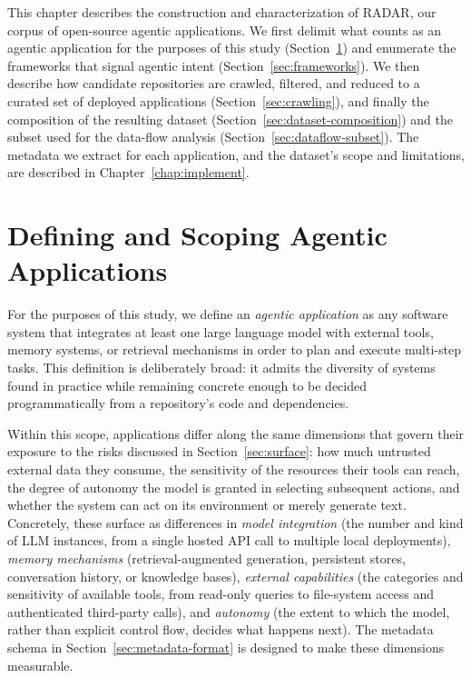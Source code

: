 \providecommand{\pv}[1]{\textcolor{blue}{#1}} %
\label{chap:toolkit}

This chapter describes the construction and characterization of RADAR, our corpus of open-source agentic applications. We first delimit what counts as an agentic application for the purposes of this study (Section~\ref{sec:defining-agentic}) and enumerate the frameworks that signal agentic intent (Section~\ref{sec:frameworks}). We then describe how candidate repositories are crawled, filtered, and reduced to a curated set of deployed applications (Section~\ref{sec:crawling}), and finally the composition of the resulting dataset (Section~\ref{sec:dataset-composition}) and the subset used for the data-flow analysis (Section~\ref{sec:dataflow-subset}). The metadata we extract for each application, and the dataset's scope and limitations, are described in Chapter~\ref{chap:implement}.
 

\section{Defining and Scoping Agentic Applications}
\label{sec:defining-agentic}
 
For the purposes of this study, we define an \emph{agentic application} as any software system that integrates at least one large language model with external tools, memory systems, or retrieval mechanisms in order to plan and execute multi-step tasks. This definition is deliberately broad: it admits the diversity of systems found in practice while remaining concrete enough to be decided programmatically from a repository's code and dependencies.
 
Within this scope, applications differ along the same dimensions that govern their exposure to the risks discussed in Section~\ref{sec:surface}: how much untrusted external data they consume, the sensitivity of the resources their tools can reach, the degree of autonomy the model is granted in selecting subsequent actions, and whether the system can act on its environment or merely generate text. Concretely, these surface as differences in \emph{model integration} (the number and kind of LLM instances, from a single hosted API call to multiple local deployments), \emph{memory mechanisms} (retrieval-augmented generation, persistent stores, conversation history, or knowledge bases), \emph{external capabilities} (the categories and sensitivity of available tools, from read-only queries to file-system access and authenticated third-party calls), and \emph{autonomy} (the extent to which the model, rather than explicit control flow, decides what happens next). The metadata schema in Section~\ref{sec:metadata-format} is designed to make these dimensions measurable.
 
